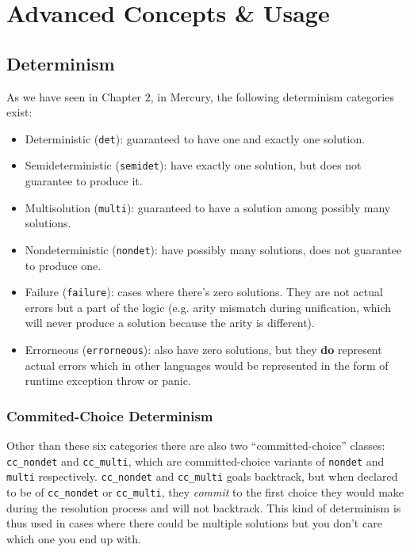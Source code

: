 \chapter{Advanced Concepts \& Usage}

\section{Determinism}

As we have seen in Chapter 2, in Mercury, the following determinism categories exist:

\begin{itemize}
	\item Deterministic (\texttt{det}): guaranteed to have one and exactly one solution.
	\item Semideterministic (\texttt{semidet}): have exactly one solution, but does not guarantee to produce it.
	\item Multisolution (\texttt{multi}): guaranteed to have a solution among possibly many solutions.
	\item Nondeterministic (\texttt{nondet}): have possibly many solutions, does not guarantee to produce one.
	\item Failure (\texttt{failure}): cases where there's zero solutions. They are not actual errors but a part of the logic (e.g. arity mismatch during unification, which will never produce a solution because the arity is different).
	\item Errorneous (\texttt{errorneous}): also have zero solutions, but they \textbf{do} represent actual errors which in other languages would be represented in the form of runtime exception throw or panic.
\end{itemize}

\subsection{Commited-Choice Determinism}

Other than these six categories there are also two ``committed-choice'' classes: \texttt{cc_nondet} and \texttt{cc_multi}, which are committed-choice variants of \texttt{nondet} and \texttt{multi} respectively. \texttt{cc_nondet} and \texttt{cc_multi} goals backtrack, but when declared to be of \texttt{cc_nondet} or \texttt{cc_multi}, they \textit{commit} to the first choice they would make during the resolution process and will not backtrack. This kind of determinism is thus used in cases where there could be multiple solutions but you don't care which one you end up with.

